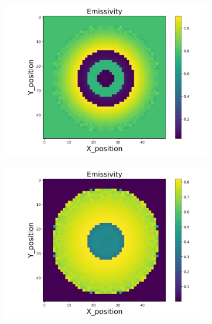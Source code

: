 \begin{figure}[p]
\begin{minipage}{\textwidth}
        \centering
        \begin{subfigure}{0.325\textwidth}
            \centering
            \includegraphics[width=\textwidth]{figures/raw_data/25/quad/emi_cal.jpg}
        \end{subfigure}
        \begin{subfigure}{0.325\textwidth}
            \centering
            \includegraphics[width=\textwidth]{figures/raw_data/26/quad/emi_cal.jpg}
        \end{subfigure}
        \begin{subfigure}{0.325\textwidth}
            \centering

\end{subfigure}
\end{minipage}
\end{figure}
